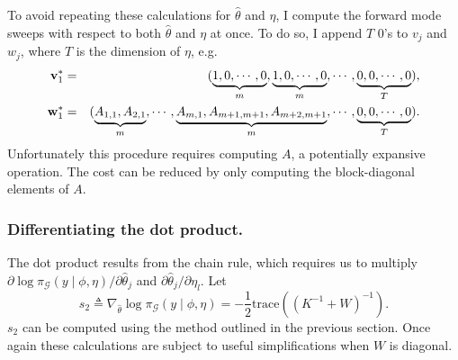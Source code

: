 \documentclass[stslayout, noinfoline]{imsart}
\theoremstyle{definition}
\begin{document}
To avoid repeating these calculations for $\hat \theta$ and $\eta$,
I compute the forward mode sweeps with respect to both $\hat \theta$ and $\eta$ at once.
To do so, I append $T$ 0's to $v_j$ and $w_j$, where $T$ is the dimension of $\eta$, e.g.
\begin{eqnarray} \label{eq:init-tangents}
  {\bf v}^*_1 & = & (\underbrace{1, 0, \cdots, 0}_m, \underbrace{1, 0, \cdots, 0}_m, \cdots, \underbrace{0, 0, \cdots, 0}_T), \nonumber \\
  {\bf w}^*_1 & = &(\underbrace{A_{1,1}, A_{2,1}}_m, \cdots, \underbrace{A_{m, 1}, A_{m + 1, m + 1}, A_{m + 2, m + 1}}_m, \cdots, \underbrace{0, 0, \cdots, 0}_T).
\end{eqnarray}
%
Unfortunately this procedure requires computing $A$, a potentially expansive operation.
The cost can be reduced by only computing the block-diagonal elements of $A$.

\subsubsection{Differentiating the dot product.}

The dot product results from the chain rule, which requires us to multiply $\partial \log \pi_\mathcal{G} (y \mid \phi, \eta)  / \partial \hat \theta_j$
and $\partial \hat \theta_j / \partial \eta_l$.
Let
\begin{equation}
  s_2 \triangleq \nabla_{\hat \theta} \log \pi_\mathcal{G} (y \mid \phi, \eta) = - \frac{1}{2} \text{trace} \left ((K^{-1} + W)^{-1} \right).
\end{equation}
%
$s_2$ can be computed using the method outlined in the previous section.
Once again these calculations are subject to useful simplifications when $W$ is diagonal.
\end{document}
